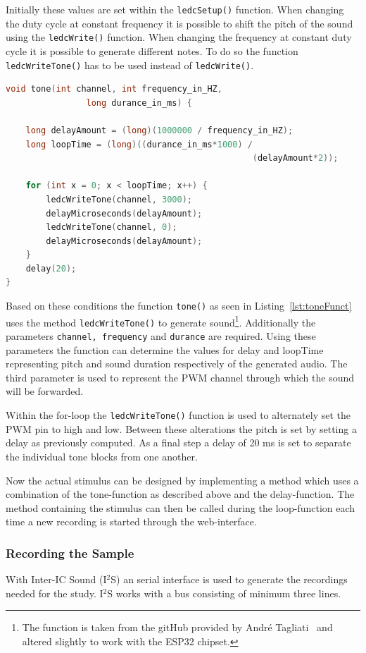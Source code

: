 Initially these values are set within the \texttt{ledcSetup()} function.
When changing the duty cycle at constant frequency it is possible to shift the pitch of the sound using the \texttt{ledcWrite()} function.
When changing the frequency at constant duty cycle it is possible to generate different notes.
To do so the function \texttt{ledcWriteTone()} has to be used instead of \texttt{ledcWrite()}.
\begin{lstlisting}[frame=single, language={c++}, style=style,
				   caption={Function used to generate a single note using frequency and sound duration.}, label={lst:toneFunct},float=!htb]
void tone(int channel, int frequency_in_HZ,
		  		long durance_in_ms) {

	long delayAmount = (long)(1000000 / frequency_in_HZ);
	long loopTime = (long)((durance_in_ms*1000) / 
												 (delayAmount*2));

	for (int x = 0; x < loopTime; x++) {
		ledcWriteTone(channel, 3000);
		delayMicroseconds(delayAmount);
		ledcWriteTone(channel, 0);
		delayMicroseconds(delayAmount);
	}
	delay(20);
}
\end{lstlisting}

Based on these conditions the function \texttt{tone()} as seen in Listing~\ref{lst:toneFunct} uses the method \texttt{ledcWriteTone()} to generate sound\footnote{The function is taken from the gitHub provided by André Tagliati~\cite{tagliati} and altered slightly to work with the ESP32 chipset.}.
Additionally the parameters \texttt{channel, frequency} and \texttt{durance} are required.
Using these parameters the function can determine the values for delay and loopTime representing pitch and sound duration respectively of the generated audio.
The third parameter is used to represent the PWM channel through which the sound will be forwarded.

Within the for-loop the \texttt{ledcWriteTone()} function is used to alternately set the PWM pin to high and low.
Between these alterations the pitch is set by setting a delay as previously computed.
As a final step a delay of 20 ms is set to separate the individual tone blocks from one another.

Now the actual stimulus can be designed by implementing a method which uses a combination of the tone-function as described above and the delay-function.
The method containing the stimulus can then be called during the loop-function each time a new recording is started through the web-interface.

\subsubsection{Recording the Sample}
With Inter-IC Sound (I$^2$S) an serial interface is used to generate the recordings needed for the study.
I$^2$S works with a bus consisting of minimum three lines.

